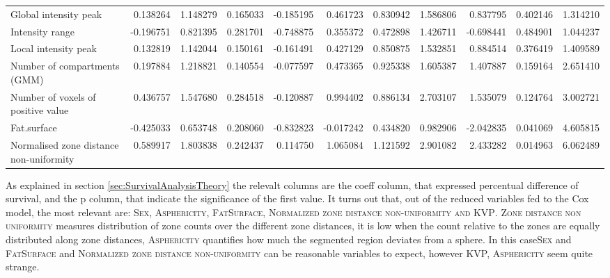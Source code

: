 \begin{table}
\begin{adjustbox}{width=0.7\paperheight, angle=90}
\begin{tabular}{|lrrrrrrrrrr|}
Global intensity peak                   &  0.138264 &   1.148279 &  0.165033 &       -0.185195 &        0.461723 &             0.830942 &             1.586806 &  0.837795 &  0.402146 &  1.314210 \\
Intensity range                         & -0.196751 &   0.821395 &  0.281701 &       -0.748875 &        0.355372 &             0.472898 &             1.426711 & -0.698441 &  0.484901 &  1.044237 \\
Local intensity peak                    &  0.132819 &   1.142044 &  0.150161 &       -0.161491 &        0.427129 &             0.850875 &             1.532851 &  0.884514 &  0.376419 &  1.409589 \\
Number of compartments (GMM)            &  0.197884 &   1.218821 &  0.140554 &       -0.077597 &        0.473365 &             0.925338 &             1.605387 &  1.407887 &  0.159164 &  2.651410 \\
Number of voxels of positive value      &  0.436757 &   1.547680 &  0.284518 &       -0.120887 &        0.994402 &             0.886134 &             2.703107 &  1.535079 &  0.124764 &  3.002721 \\
Fat.surface                             & -0.425033 &   0.653748 &  0.208060 &       -0.832823 &       -0.017242 &             0.434820 &             0.982906 & -2.042835 &  0.041069 &  4.605815 \\
Normalised zone distance non-uniformity &  0.589917 &   1.803838 &  0.242437 &        0.114750 &        1.065084 &             1.121592 &             2.901082 &  2.433282 &  0.014963 &  6.062489 \\
\bottomrule
\end{tabular}
\end{adjustbox}
\end{table}

As explained in section \ref{sec:SurvivalAnalysisTheory} the relevalt columns are the coeff column, that expressed percentual difference of survival, and the p column, that indicate the significance of the first value.
It turns out that, out of the reduced variables fed to the Cox model, the most relevant are: {\scshape Sex, Asphericity, FatSurface, Normalized zone distance non-uniformity and KVP}.
{\scshape Zone distance non uniformity} measures distribution of zone counts over the different zone distances, it is low when the count relative to the zones are equally distributed along zone distances, {\scshape Asphericity} quantifies how much the segmented region deviates from a sphere.
In this case{\scshape Sex} and {\scshape FatSurface} and {\scshape Normalized zone distance non-uniformity} can be reasonable variables to expect, however {\scshape KVP, Asphericity} seem quite strange.

